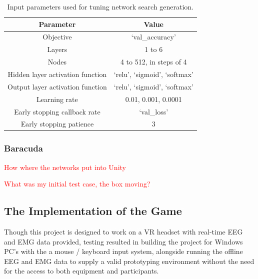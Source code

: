 \documentclass[11pt, a4paper]{article}
\newcommand{\commentintext}[1]
{\hfill 

\textcolor{red}{#1} 
	
\hfill
}
\begin{document}
\begin{table}[H]
	\centering
	\begin{tabular}{ |c|c| }
		\hline
		
		Parameter 								& Value 							\\	\hline \hline
		
		Objective 								& `val\_accuracy' 					\\ 	\hline
		Layers 									& 1 to 6 							\\ 	\hline
		Nodes 									& 4 to 512, in steps of 4 			\\  \hline
		Hidden layer activation function 		& `relu', `sigmoid', `softmax' 		\\	\hline
		Output layer activation function 		& `relu', `sigmoid', `softmax' 		\\	\hline
		Learning rate 							& 0.01, 0.001, 0.0001 				\\	\hline
		Early stopping callback rate			& `val\_loss' 						\\  \hline
		Early stopping patience					& 3 								\\	
		
		\hline		
	\end{tabular}
	\caption{Input parameters used for tuning network search generation.}
	\label{tab:ffnn_:_search_parameters}
\end{table}



\subsubsection{Baracuda}	

\commentintext{How where the networks put into Unity}
\commentintext{What was my initial test case, the box moving?}





\pagebreak
\subsection{The Implementation of the Game}


Though this project is designed to work on a VR headset with real-time EEG and EMG data provided, testing resulted in building the project for Windows PC's with the a mouse / keyboard input system, alongside running the offline EEG and EMG data to supply a valid prototyping environment without the need for the access to both equipment and participants.  
\end{document}
